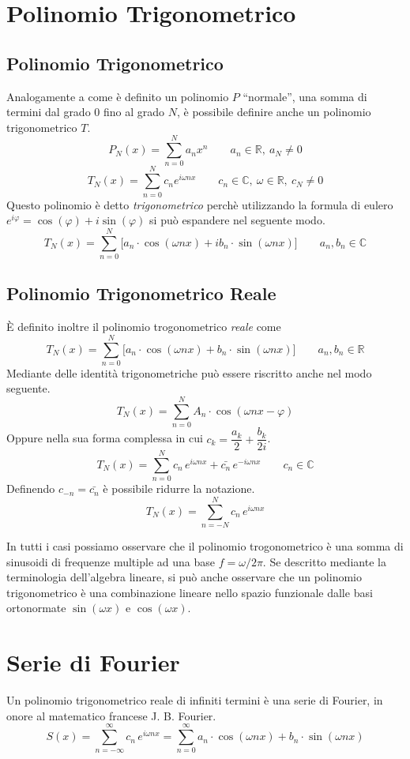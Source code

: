 \section{Polinomio Trigonometrico}
\subsection{Polinomio Trigonometrico}
Analogamente a come \`e definito un polinomio \(P\) ``normale'', una somma di
termini dal grado 0 fino al grado \(N\), \`e possibile definire anche un
polinomio trigonometrico \(T\).
\[
    P_N(x) = \sum_{n=0}^N a_n x^n \qquad a_n \in \mathbb{R},~ a_N \neq 0
\]
\[
    T_N(x) = \sum_{n=0}^N c_n e^{i\omega nx} 
        \qquad c_n \in\mathbb{C},~\omega\in\mathbb{R}, ~ c_N \neq 0
\]
Questo polinomio \`e detto \emph{trigonometrico} perch\`e utilizzando la
formula di eulero \(e^{i\varphi} = \cos(\varphi) + i\sin(\varphi)\) si pu\`o
espandere nel seguente modo.
\[
    T_N(x) = \sum_{n=0}^N\big [a_n\cdot\cos(\omega nx) + ib_n\cdot\sin(\omega nx)]
    \qquad a_n, b_n \in \mathbb{C}
\]

\subsection{Polinomio Trigonometrico Reale} \label{sec:real-trig}
\`E definito inoltre il polinomio trogonometrico \emph{reale} come
\[
    T_N(x) = \sum_{n=0}^N\big [a_n\cdot\cos(\omega nx) + b_n\cdot\sin(\omega nx)]
    \qquad a_n, b_n \in \mathbb{R}
\]
Mediante delle identit\`a trigonometriche pu\`o essere riscritto anche nel
modo seguente.
\[
    T_N(x) = \sum_{n=0}^N A_n\cdot\cos(\omega nx - \varphi)
\]
Oppure nella sua forma complessa in cui \(c_k = \dfrac{a_k}{2} + \dfrac{b_k}{2i}\).
\[
    T_N(x) = \sum_{n=0}^N c_n\,e^{i\omega nx} + \bar{c_n}\,e^{-i\omega nx}
    \qquad c_n \in \mathbb{C}
\]
Definendo \(c_{-n} = \bar{c_n}\) \`e possibile ridurre la notazione.
\[
    T_N(x) = \sum_{n=-N}^N c_n\,e^{i\omega nx}
\]

In tutti i casi possiamo osservare che il polinomio trogonometrico \`e una
somma di sinusoidi di frequenze multiple ad una base \(f = \omega/2\pi\).  Se
descritto mediante la terminologia dell'algebra lineare, si pu\`o anche
osservare che un polinomio trigonometrico \`e una combinazione lineare nello
spazio funzionale dalle basi ortonormate \(\sin(\omega x)\) e \(\cos(\omega
x)\).


\section{Serie di Fourier}
Un polinomio trigonometrico reale di infiniti termini \`e una serie di Fourier,
in onore al matematico francese  J. B. Fourier.
\[
	S(x) = \sum_{n=-\infty}^\infty c_n\,e^{i\omega nx} 
         = \sum_{n=0}^\infty a_n\cdot\cos(\omega nx) + b_n\cdot\sin(\omega nx)
\]

